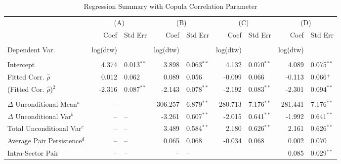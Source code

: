 \begin{table}
    \fontsize{8pt}{8pt}\selectfont
    \caption{Regression Summary with Copula Correlation Parameter}
    \centering
    \begin{tabular}{l r l r l r l r l}
        \midrule
         & \multicolumn{2}{c}{(A)} & \multicolumn{2}{c}{(B)} & \multicolumn{2}{c}{(C)} & \multicolumn{2}{c}{(D)}  \\
         & Coef & Std Err & Coef & Std Err & Coef & Std Err & Coef & Std Err  \\
        \midrule
                                                                                                                                                \\
        Dependent Var.                     & log(dtw)&              & log(dtw)&              & log(dtw)&              & log(dtw)&               \\
                                                                                                                                                \\
        Intercept                          &   4.374 & 0.013$^{**}$ &   3.898 & 0.063$^{**}$ &   4.132 & 0.070$^{**}$ &   4.089 & 0.075$^{**}$  \\
        Fitted Corr. $\hat{\rho}$          &   0.012 & 0.062        &   0.089 & 0.056        &  -0.099 & 0.066        &  -0.113 & 0.066$^{+}$   \\
        (Fitted Cor. $\hat{\rho}$)$^{2}$   &  -2.316 & 0.087$^{**}$ &  -2.143 & 0.078$^{**}$ &  -2.192 & 0.083$^{**}$ &  -2.301 & 0.094$^{**}$  \\  \\        
        $\Delta$ Unconditional Mean$^{a}$  &      -- & --           & 306.257 & 6.879$^{**}$ & 280.713 & 7.176$^{**}$ & 281.441 & 7.176$^{**}$  \\
        $\Delta$ Unconditional Var$^{b}$   &      -- & --           &  -3.261 & 0.607$^{**}$ &  -2.015 & 0.641$^{**}$ &  -1.992 & 0.641$^{**}$  \\
        Total Unconditional Var$^{c}$      &      -- & --           &   3.489 & 0.584$^{**}$ &   2.180 & 0.626$^{**}$ &   2.161 & 0.626$^{**}$  \\
        Average Pair Persistence$^{d}$     &      -- & --           &   0.065 & 0.068        &  -0.034 & 0.068        &   0.002 & 0.070         \\
        Intra-Sector Pair                  &      -- & --           &      -- & --           &         &              &   0.085 & 0.029$^{**}$  \\

\end{tabular}
\end{table}

